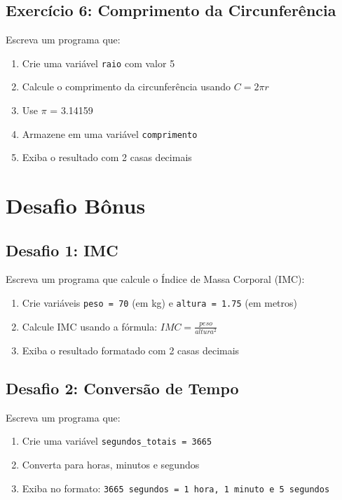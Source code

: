 \documentclass[12pt]{article}
\begin{document}
\subsection*{Exercício 6: Comprimento da Circunferência}
Escreva um programa que:
\begin{enumerate}
    \item Crie uma variável \texttt{raio} com valor 5
    \item Calcule o comprimento da circunferência usando $C = 2\pi r$
    \item Use  $\pi$ =  3.14159
    \item Armazene em uma variável \texttt{comprimento}
    \item Exiba o resultado com 2 casas decimais
\end{enumerate}

\section*{Desafio Bônus}

\subsection*{Desafio 1: IMC}
Escreva um programa que calcule o Índice de Massa Corporal (IMC):
\begin{enumerate}
    \item Crie variáveis \texttt{peso = 70} (em kg) e \texttt{altura = 1.75} (em metros)
    \item Calcule IMC usando a fórmula: $IMC = \frac{peso}{altura^2}$
    \item Exiba o resultado formatado com 2 casas decimais
\end{enumerate}

\subsection*{Desafio 2: Conversão de Tempo}
Escreva um programa que:
\begin{enumerate}
    \item Crie uma variável \texttt{segundos\_totais = 3665}
    \item Converta para horas, minutos e segundos
    \item Exiba no formato: \texttt{3665 segundos = 1 hora, 1 minuto e 5 segundos}
\end{enumerate}
\end{document}
